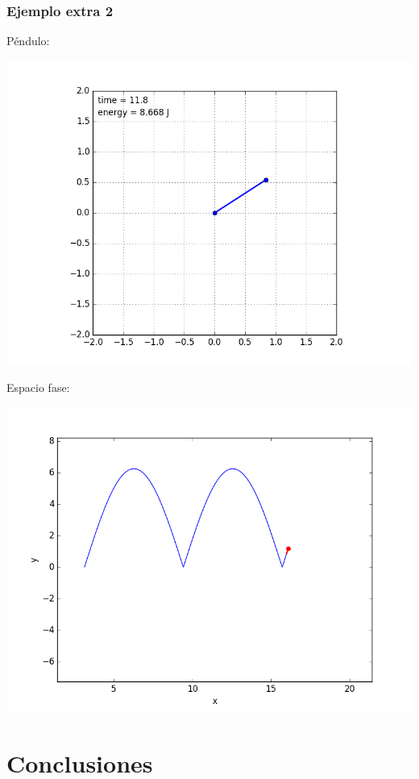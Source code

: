 \documentclass[12pt,letterpaper]{article}
\begin{document}
\subsubsection*{Ejemplo extra 2}
Péndulo:
\begin{center}
\includegraphics[scale=0.3]{e.png}
\end{center}
Espacio fase:
\begin{center}
\includegraphics[scale=0.3]{e1.png}
\end{center}

\section{Conclusiones}
\end{document}
